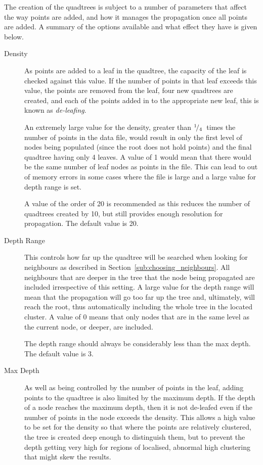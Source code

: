 The creation of the quadtrees is subject to a number of parameters that affect
the way points are added, and how it manages the propagation once all points
are added. A summary of the options available and what effect they have is
given below.

\begin{description}

	\item[Density] As points are added to a leaf in the quadtree, the capacity
		of the leaf is checked against this value. If the number of points in
		that leaf exceeds this value, the points are removed from the leaf,
		four new quadtrees are created, and each of the points added in to the
		appropriate new leaf, this is known as \emph{de-leafing}.

		An extremely large value for the density, greater than
		${}^{1}\!/_{4}$~times the number of points in the data file, would
		result in only the first level of nodes being populated (since the root
		does not hold points) and the final quadtree having only 4 leaves. A
		value of 1 would mean that there would be the same number of leaf nodes
		as points in the file. This can lead to out of memory errors in some
		cases where the file is large and a large value for depth range is set.

		A value of the order of 20 is recommended as this reduces the number of
		quadtrees created by 10, but still provides enough resolution for
		propagation. The default value is 20.

	\item[Depth Range] This controls how far up the quadtree will be searched
		when looking for neighbours as described in
		Section~\ref{sub:choosing_neighbours}. All neighbours that are deeper
		in the tree that the node being propagated are included irrespective of
		this setting. A large value for the depth range will mean that the
		propagation will go too far up the tree and, ultimately, will reach the
		root, thus automatically including the whole tree in the located
		cluster. A value of 0 means that only nodes that are in the same level
		as the current node, or deeper, are included.

		The depth range should always be considerably less than the max depth.
		The default value is 3.

	\item[Max Depth] As well as being controlled by the number of points in the
		leaf, adding points to the quadtree is also limited by the maximum
		depth. If the depth of a node reaches the maximum depth, then it is not
		de-leafed even if the number of points in the node exceeds the density.
		This allows a high value to be set for the density so that where the
		points are relatively clustered, the tree is created deep enough to
		distinguish them, but to prevent the depth getting very high for
		regions of localised, abnormal high clustering that might skew the
		results.


\end{description}
